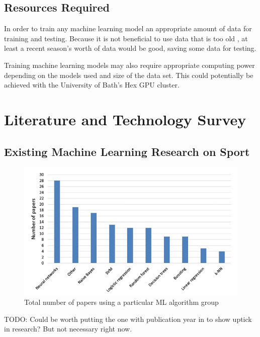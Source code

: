 \documentclass[12pt,a4paper]{report}
\theoremstyle{definition}
\begin{document}
\section{Resources Required}

In order to train any machine learning model an appropriate amount of data for training and testing. 
Because it is not beneficial to use data that is too old \citep{horvat2020}, at least a recent season's worth of data would be good, saving some data for testing. 

Training machine learning models may also require appropriate computing power depending on the models used and size of the data set. 
This could potentially be achieved with the University of Bath's Hex GPU cluster.

\chapter{Literature and Technology Survey}

\section{Existing Machine Learning Research on Sport}

\begin{figure}[H]
    \centering
    \includegraphics[width=\linewidth]{Horvat&Job_Figure2.png}
    \caption{Total number of papers using a particular ML algorithm group \citep{horvat2020}}
    \label{fig:NoPapers}
\end{figure}

TODO: Could be worth putting the one with publication year in to show uptick in research? But not necessary right now.
\end{document}
